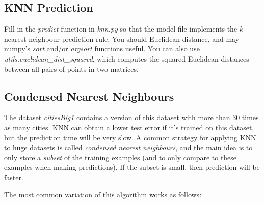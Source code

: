 \documentclass{article}
\begin{document}
\subsection{KNN Prediction}

Fill in the \emph{predict} function in \emph{knn.py} so that the model file implements the $k$-nearest neighbour prediction rule. You should Euclidean distance, and may numpy's \emph{sort} and/or \emph{argsort} functions useful. You can also use \emph{utils.euclidean\_dist\_squared}, which computes the squared Euclidean distances between all pairs of points in two matrices.


\subsection{Condensed Nearest Neighbours}

The dataset \emph{citiesBig1} contains a version of this dataset with more than 30 times as many cities. KNN can obtain a lower test error if it's trained on this dataset, but the prediction time will be very slow. A common strategy for applying KNN to huge datasets is called \emph{condensed nearest neighbours}, and the main idea is to only store a \emph{subset} of the training examples (and to only compare to these examples when making predictions). If the subset is small, then prediction will be faster.

The most common variation of this algorithm works as follows:
\end{document}
